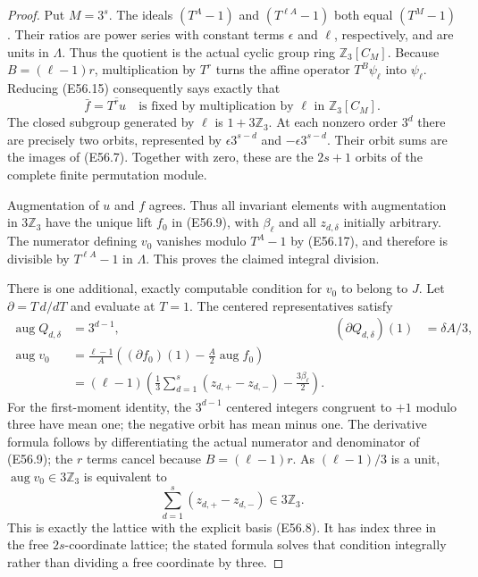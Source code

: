 \begin{proof}
Put $M=3^s$. The ideals
$(T^A-1)$ and $(T^{\ell A}-1)$
both equal $(T^M-1)$.
Their ratios are power series with
constant terms $\epsilon$ and $\ell$,
respectively, and are units in $\Lambda$.
Thus the quotient is the actual cyclic
group ring $\mathbb Z_3[C_M]$.
Because $B=(\ell-1)r$, multiplication
by $T^r$ turns the affine operator
$T^B\psi_\ell$ into $\psi_\ell$.
Reducing (E56.15) consequently says
exactly that
\[
             \bar f=\overline{T^r u}
              \quad\text{is fixed by multiplication by }\ell
                        \text{ in }\mathbb Z_3[C_M].
 \tag{E56.17}
\]
The closed subgroup generated by $\ell$
is $1+3\mathbb Z_3$. At each nonzero
order $3^d$ there are precisely two
orbits, represented by
$\epsilon3^{s-d}$ and
$-\epsilon3^{s-d}$. Their orbit sums
are the images of (E56.7).
Together with zero, these are the
$2s+1$ orbits of the complete
finite permutation module.

Augmentation of $u$ and $f$ agrees.
Thus all invariant elements with
augmentation in $3\mathbb Z_3$ have
the unique lift $f_0$ in (E56.9),
with $\beta_\ell$ and all
$z_{d,\delta}$ initially arbitrary.
The numerator defining $v_0$
vanishes modulo $T^A-1$ by
(E56.17), and therefore is divisible
by $T^{\ell A}-1$ in $\Lambda$.
This proves the claimed integral
division.

There is one additional, exactly
computable condition for $v_0$ to
belong to $J$. Let
$\partial=T\,d/dT$ and evaluate
at $T=1$. The centered representatives
satisfy
\[
 \begin{aligned}
 \operatorname{aug}Q_{d,\delta}&=3^{d-1},&
 (\partial Q_{d,\delta})(1)&=\delta A/3,\\
 \operatorname{aug}v_0
   &=\frac{\ell-1}{A}
       \left((\partial f_0)(1)
                       -\frac A2\operatorname{aug}f_0\right)\\
   &=(\ell-1)\left(
          \frac13\sum_{d=1}^s(z_{d,+}-z_{d,-})
                                      -\frac{3\beta_\ell}{2}\right).
 \end{aligned}
 \tag{E56.18}
\]
For the first-moment identity, the
$3^{d-1}$ centered integers congruent
to $+1$ modulo three have mean one;
the negative orbit has mean minus one.
The derivative formula follows by
differentiating the actual numerator
and denominator of (E56.9); the
$r$ terms cancel because
$B=(\ell-1)r$.
As $(\ell-1)/3$ is a unit,
$\operatorname{aug}v_0\in3\mathbb Z_3$
is equivalent to
\[
          \sum_{d=1}^s(z_{d,+}-z_{d,-})\in3\mathbb Z_3.
 \tag{E56.19}
\]
This is exactly the lattice with
the explicit basis (E56.8).
It has index three in the
free $2s$-coordinate lattice;
the stated formula solves that
condition integrally rather than
dividing a free coordinate by
three.


\end{proof}
